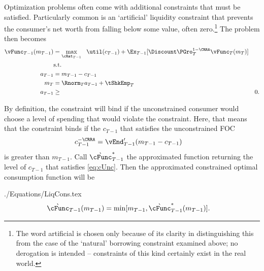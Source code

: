 \documentclass[titlepage]{\econtex}
\begin{document}
Optimization problems often come with additional constraints that must
be satisfied.  Particularly common is an `artificial' liquidity constraint that
prevents the consumer's net worth from falling below some value, often
zero.\footnote{The word artificial is chosen only because of its clarity in distinguishing
  this from the case of the `natural' borrowing constraint examined above; no derogation is
  intended -- constraints of this kind certainly exist in the real world.}  The problem then becomes
\begin{equation*}\begin{gathered}\begin{aligned}
  {\vFunc}_{T-1}({m}_{T-1})  & = \max_{\cRat_{T-1}} ~~ \util({c}_{T-1}) + \Ex_{T-1} [\Discount \PGro_{T}^{1-\CRRA}{\vFunc}_{T}({m}_{T})] \label{eq:ConstrArt}
  \\ & \mbox{s.t.}&  \nonumber
  \\ {a}_{T-1}  & = {m}_{T-1} - {c}_{T-1}
  \\ {m}_{T}  & = \Rnorm_{T} {a}_{T-1} + \tShkEmp_{T}
  \\ {a}_{T-1} & \geq & 0 .
\end{aligned}\end{gathered}\end{equation*}


By definition, the constraint will bind if the unconstrained consumer
would choose a level of spending that would violate the constraint.
Here, that means that the constraint binds if the ${c}_{T-1}$
that satisfies the unconstrained FOC
\begin{equation}\begin{gathered}\begin{aligned}
  {c}_{T-1}^{-\CRRA}  & = \vEnd_{T-1}^{\prime}({m}_{T-1}-{c}_{T-1}) \label{eq:cUnc}
\end{aligned}\end{gathered}\end{equation}
is greater than ${m}_{T-1}$.  Call $\grave{\cFunc}^{\ast}_{T-1}$ the approximated function
returning the level of ${c}_{T-1}$ that satisfies \eqref{eq:cUnc}.
Then the approximated constrained optimal consumption function will be
\begin{verbatimwrite}{./Equations/LiqCons.tex}
  \begin{equation}\begin{gathered}\begin{aligned}
    \grave{\cFunc}_{T-1}({m}_{T-1})  & = \min[{m}_{T-1},\grave{\cFunc}^{\ast}_{T-1}({m}_{T-1})] \label{eq:LiqCons}.
  \end{aligned}\end{gathered}\end{equation}
\end{verbatimwrite}

\end{document}
